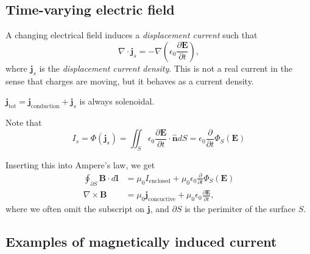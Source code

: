 \documentclass[a4paper, 12pt]{article}
\renewcommand{\vec}[1]{\mathbf{#1}}
\newcommand{\E}{\ensuremath{\vec{E}}}
\newcommand{\e}{\ensuremath{\epsilon_0}}
\renewcommand{\j}{\ensuremath{\vec{j}}}
\newcommand{\B}{\ensuremath{\vec{B}}}
\let\tmp\hat
\renewcommand{\hat}[1]{\vec{\tmp{#1}}}
\begin{document}
    \subsection{Time-varying electric field}
        A changing electrical field induces a \textit{displacement current} such that
        \begin{equation}
            \nabla \cdot \j_s = -\nabla\left(\e\frac{\partial\E}{\partial t}\right),
        \end{equation}
        where $\j_s$ is the \textit{displacement current density}. This is not a real current in the sense that charges are moving, 
        but it behaves as a current density.

        $\j_{\text{tot}} = \j_{\text{conduction}} + \j_s$ is always solenoidal. 

        Note that 
        \begin{equation*}
            I_s = \Phi(\j_s) = \iint_S \e\frac{\partial\E}{\partial t}\cdot\hat{n}dS = \e\frac{\partial}{\partial t}\Phi_S(\E)
        \end{equation*}

        Inserting this into Ampere's law, we get 
        \begin{align}
            \oint_{\partial S}\B\cdot d\vec{l} &= \mu_0 I_{\text{enclosed}} + \mu_0\e\frac{\partial}{\partial t}\Phi_S\left(\E\right)\\
            \nabla\times\B &= \mu_0\j_{\text{concuctive}} + \mu_0\e\frac{\partial\E}{\partial t},
        \end{align}
        where we often omit the subscript on $\j$, and $\partial S$ is the perimiter of the surface $S$.
    
    \subsection{Examples of magnetically induced current}
\end{document}
